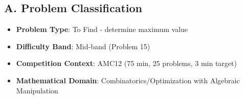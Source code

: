 \documentclass[]{article}
\begin{document}
\begin{problemconfigbox}
\subsection*{A. Problem Classification}
\begin{itemize}[leftmargin=*]
    \item \textbf{Problem Type}: To Find - determine maximum value
    \item \textbf{Difficulty Band}: Mid-band (Problem 15)
    \item \textbf{Competition Context}: AMC12 (75 min, 25 problems, 3 min target)
    \item \textbf{Mathematical Domain}: Combinatorics/Optimization with Algebraic Manipulation
\end{itemize}


\end{problemconfigbox}
\end{document}
